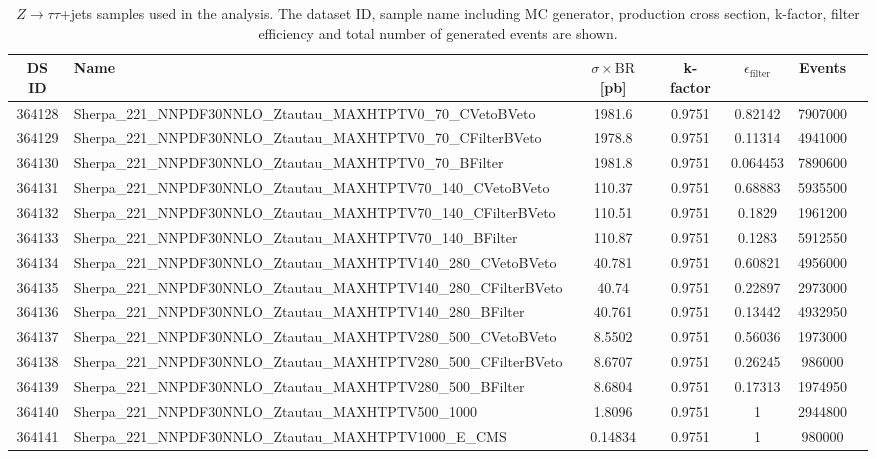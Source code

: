 \begin{landscape}
\begin{table}[!htb]
\caption[$Z\to \tau\tau + $ jets Monte Carlo samples for background estimation]{$Z \to \tau\tau$+jets samples used in the analysis. The dataset ID, sample name including MC generator, production cross section, k-factor, filter efficiency and total number of generated events are shown.}
\label{tabular:mc_samples_Ztautaujets}
\begin{footnotesize}
\begin{center}
\begin{tabular}{c|l|c|c|c|cr}
	\hline\hline
	DS ID & Name & $\sigma\times\text{BR}$ [pb] & k-factor & $\epsilon_{\text{filter}}$ & Events \\ \hline\hline
364128 & Sherpa\_221\_NNPDF30NNLO\_Ztautau\_MAXHTPTV0\_70\_CVetoBVeto & 1981.6 & 0.9751 & 0.82142 & 7907000 \\
364129 & Sherpa\_221\_NNPDF30NNLO\_Ztautau\_MAXHTPTV0\_70\_CFilterBVeto & 1978.8 & 0.9751 & 0.11314 & 4941000 \\
364130 & Sherpa\_221\_NNPDF30NNLO\_Ztautau\_MAXHTPTV0\_70\_BFilter & 1981.8 & 0.9751 & 0.064453 & 7890600 \\
364131 & Sherpa\_221\_NNPDF30NNLO\_Ztautau\_MAXHTPTV70\_140\_CVetoBVeto & 110.37 & 0.9751 & 0.68883 & 5935500 \\
364132 & Sherpa\_221\_NNPDF30NNLO\_Ztautau\_MAXHTPTV70\_140\_CFilterBVeto & 110.51 & 0.9751 & 0.1829 & 1961200 \\
364133 & Sherpa\_221\_NNPDF30NNLO\_Ztautau\_MAXHTPTV70\_140\_BFilter & 110.87 & 0.9751 & 0.1283 & 5912550 \\
364134 & Sherpa\_221\_NNPDF30NNLO\_Ztautau\_MAXHTPTV140\_280\_CVetoBVeto & 40.781 & 0.9751 & 0.60821 & 4956000 \\
364135 & Sherpa\_221\_NNPDF30NNLO\_Ztautau\_MAXHTPTV140\_280\_CFilterBVeto & 40.74 & 0.9751 & 0.22897 & 2973000 \\
364136 & Sherpa\_221\_NNPDF30NNLO\_Ztautau\_MAXHTPTV140\_280\_BFilter & 40.761 & 0.9751 & 0.13442 & 4932950 \\
364137 & Sherpa\_221\_NNPDF30NNLO\_Ztautau\_MAXHTPTV280\_500\_CVetoBVeto & 8.5502 & 0.9751 & 0.56036 & 1973000 \\
364138 & Sherpa\_221\_NNPDF30NNLO\_Ztautau\_MAXHTPTV280\_500\_CFilterBVeto & 8.6707 & 0.9751 & 0.26245 & 986000 \\
364139 & Sherpa\_221\_NNPDF30NNLO\_Ztautau\_MAXHTPTV280\_500\_BFilter & 8.6804 & 0.9751 & 0.17313 & 1974950 \\
364140 & Sherpa\_221\_NNPDF30NNLO\_Ztautau\_MAXHTPTV500\_1000 & 1.8096 & 0.9751 & 1 & 2944800 \\
364141 & Sherpa\_221\_NNPDF30NNLO\_Ztautau\_MAXHTPTV1000\_E\_CMS & 0.14834 & 0.9751 & 1 & 980000 \\
	\hline\hline
\end{tabular}
\end{center}
\end{footnotesize}
\end{table}


\end{landscape}
